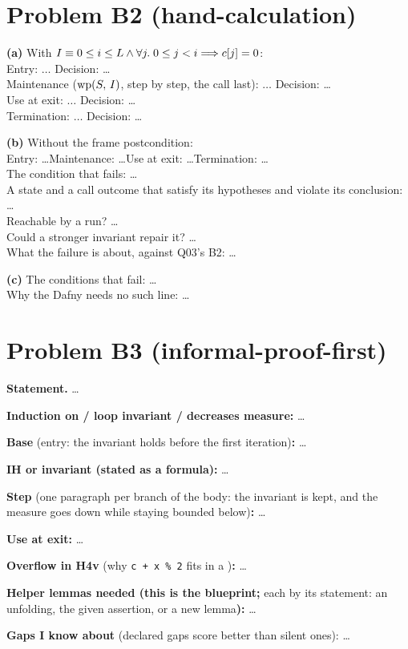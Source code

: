 \documentclass[11pt]{article}
\begin{document}
\section*{Problem B2 (hand-calculation)}\label{ans:B2}
\begin{answer}
\textbf{(a)} With $I \equiv 0 \leq i \leq L \wedge \forall j .\; 0 \leq j < i \Longrightarrow c[j] = 0$: \\
Entry: $\dots$ \quad Decision: \dots \\
Maintenance ($\mathrm{wp}(S,\,I)$, step by step, the call last): $\dots$ \quad Decision: \dots \\
Use at exit: $\dots$ \quad Decision: \dots \\
Termination: $\dots$ \quad Decision: \dots

\textbf{(b)} Without the frame postcondition: \\
Entry: \dots \quad Maintenance: \dots \quad Use at exit: \dots \quad Termination: \dots \\
The condition that fails: \dots \\
A state and a call outcome that satisfy its hypotheses and violate its conclusion: \dots \\
Reachable by a run? \dots \\
Could a stronger invariant repair it? \dots \\
What the failure is about, against Q03's B2: \dots

\textbf{(c)} The conditions that fail: \dots \\
Why the Dafny  needs no such line: \dots
\end{answer}

\section*{Problem B3 (informal-proof-first)}\label{ans:B3}
\begin{answer}
\textbf{Statement.} \dots

\textbf{Induction on / loop invariant / decreases measure:} \dots

\textbf{Base} (entry: the invariant holds before the first iteration)\textbf{:} \dots

\textbf{IH or invariant (stated as a formula):} \dots

\textbf{Step} (one paragraph per branch of the body: the invariant is kept,
and the measure goes down while staying bounded below)\textbf{:} \dots

\textbf{Use at exit:} \dots

\textbf{Overflow in H4v} (why \texttt{c + x \% 2} fits in a )\textbf{:} \dots

\textbf{Helper lemmas needed (this is the blueprint;} each by its statement:
an unfolding, the given assertion, or a new lemma\textbf{):} \dots

\textbf{Gaps I know about} (declared gaps score better than silent ones): \dots
\end{answer}
\end{document}
